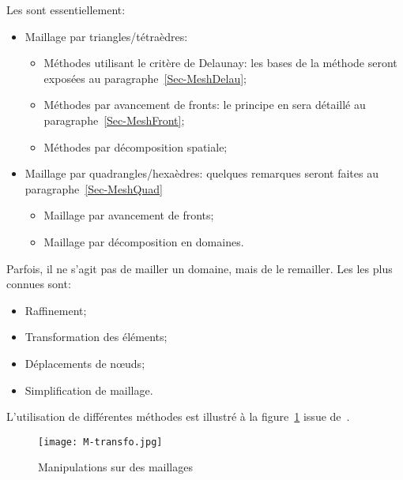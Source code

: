 \medskip
%
Les  sont essentiellement:
\begin{itemize}
   \item Maillage par triangles/tétraèdres:
   \begin{itemize}
      \item Méthodes utilisant le critère de Delaunay: les bases de la méthode seront exposées au paragraphe~\ref{Sec-MeshDelau};
      \item Méthodes par avancement de fronts: le principe en sera détaillé au paragraphe~\ref{Sec-MeshFront};
      \item Méthodes par décomposition spatiale;
   \end{itemize}
   \item Maillage par quadrangles/hexaèdres: quelques remarques seront faites au paragraphe~\ref{Sec-MeshQuad}
   \begin{itemize}
      \item Maillage par avancement de fronts;
      \item Maillage par décomposition en domaines.
   \end{itemize}
\end{itemize}

\medskip
Parfois, il ne s'agit pas de mailler un domaine, mais de le remailler.
Les  les plus connues sont:
\begin{itemize}
   \item Raffinement;
   \item Transformation des éléments;
   \item Déplacements de nœuds;
   \item Simplification de maillage.
\end{itemize}

L'utilisation de différentes méthodes est illustré à la figure~\ref{Fig-MeshAlliez} issue de~\cite{bib-Alliez}.
\begin{figure}[htb]
\begin{center}
\texttt{[image: M-transfo.jpg]}
\end{center}
\caption{Manipulations sur des maillages}\label{Fig-MeshAlliez}
\end{figure}

